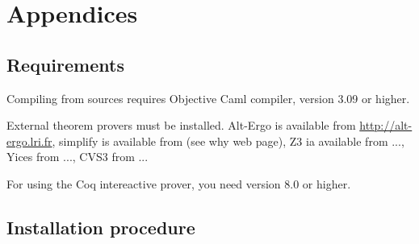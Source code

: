 \documentclass[a4paper,11pt,twoside,openright]{report}
\begin{document}




\chapter{Appendices}

\section{Requirements}
\label{app:requirements}


Compiling from sources requires Objective Caml
compiler, version 3.09 or higher. 

External theorem provers must be installed. Alt-Ergo is available from
\url{http://alt-ergo.lri.fr}, simplify is available from \url{} (see why
web page), Z3 ia available from ..., Yices from ..., CVS3 from ...

For using the Coq intereactive prover, you need \Coq{} version 8.0 or
higher.

\section{Installation procedure}
\end{document}
